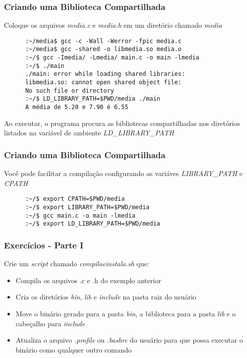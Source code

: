 \documentclass{beamer}
\begin{document}
   \begin{frame}[fragile]
      \frametitle{Criando uma Biblioteca Compartilhada}
      Coloque os arquivos \textit{media.c} e \textit{media.h} em um diretório chamado \textit{media} \\
      \begin{verbatim}
      :~/media$ gcc -c -Wall -Werror -fpic media.c
      :~/media$ gcc -shared -o libmedia.so media.o
      :~/$ gcc -Imedia/ -Lmedia/ main.c -o main -lmedia
      :~/$ ./main 
      ./main: error while loading shared libraries: 
      libmedia.so: cannot open shared object file: 
      No such file or directory
      :~/$ LD_LIBRARY_PATH=$PWD/media ./main
      A média de 5.20 e 7.90 é 6.55
      \end{verbatim}
      Ao executar, o programa procura as bibliotecas compartilhadas nos diretórios listados na variável de ambiente \textit{LD\_LIBRARY\_PATH}
\end{frame}

   \begin{frame}[fragile]
      \frametitle{Criando uma Biblioteca Compartilhada}
      Você pode facilitar a compilação configurando as variáves \textit{LIBRARY\_PATH} e \textit{CPATH}
      \begin{verbatim}
      :~/$ export CPATH=$PWD/media
      :~/$ export LIBRARY_PATH=$PWD/media
      :~/$ gcc main.c -o main -lmedia
      :~/$ export LD_LIBRARY_PATH=$PWD/media
      \end{verbatim}
\end{frame}

   \begin{frame}
      \frametitle{Exercícios - Parte I}
      Crie um \textit{script} chamado \textit{compilaeinstala.sh} que:
      \begin{itemize}
         \item Compila os arquivos .c e .h do exemplo anterior
	 \item Cria os diretórios \textit{bin}, \textit{lib} e \textit{include} na pasta raiz do usuário
	 \item Move o binário gerado para a pasta \textit{bin}, a biblioteca para a pasta \textit{lib} e o cabeçalho para \textit{include}
	 \item Atualiza o arquivo \textit{.profile} ou \textit{.bashrc} do usuário para que possa executar o binário como qualquer outro comando
      \end{itemize}
   \end{frame}
\end{document}
